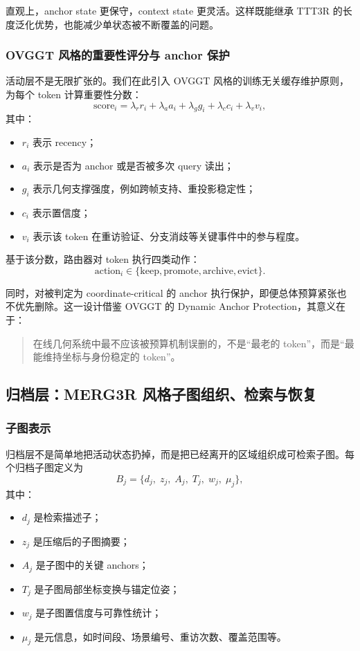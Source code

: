 \documentclass[12pt]{article}
\begin{document}
直观上，anchor state 更保守，context state 更灵活。这样既能继承 TTT3R 的长度泛化优势，也能减少单状态被不断覆盖的问题。

\subsubsection{OVGGT 风格的重要性评分与 anchor 保护}

活动层不是无限扩张的。我们在此引入 OVGGT 风格的训练无关缓存维护原则，为每个 token 计算重要性分数：
\begin{equation}
\mathrm{score}_i = \lambda_r r_i + \lambda_a a_i + \lambda_g g_i + \lambda_c c_i + \lambda_v v_i,
\end{equation}
其中：
\begin{itemize}
  \item $r_i$ 表示 recency；
  \item $a_i$ 表示是否为 anchor 或是否被多次 query 读出；
  \item $g_i$ 表示几何支撑强度，例如跨帧支持、重投影稳定性；
  \item $c_i$ 表示置信度；
  \item $v_i$ 表示该 token 在重访验证、分支消歧等关键事件中的参与程度。
\end{itemize}

基于该分数，路由器对 token 执行四类动作：
\begin{equation}
\mathrm{action}_i \in \{\text{keep}, \text{promote}, \text{archive}, \text{evict}\}.
\end{equation}

同时，对被判定为 coordinate-critical 的 anchor 执行保护，即便总体预算紧张也不优先删除。这一设计借鉴 OVGGT 的 Dynamic Anchor Protection，其意义在于：
\begin{quote}
在线几何系统中最不应该被预算机制误删的，不是“最老的 token”，而是“最能维持坐标与身份稳定的 token”。
\end{quote}

\subsection{归档层：MERG3R 风格子图组织、检索与恢复}

\subsubsection{子图表示}

归档层不是简单地把活动状态扔掉，而是把已经离开的区域组织成可检索子图。每个归档子图定义为
\begin{equation}
B_j = \{d_j,\; z_j,\; A_j,\; T_j,\; w_j,\; \mu_j\},
\end{equation}
其中：
\begin{itemize}
  \item $d_j$ 是检索描述子；
  \item $z_j$ 是压缩后的子图摘要；
  \item $A_j$ 是子图中的关键 anchors；
  \item $T_j$ 是子图局部坐标变换与锚定位姿；
  \item $w_j$ 是子图置信度与可靠性统计；
  \item $\mu_j$ 是元信息，如时间段、场景编号、重访次数、覆盖范围等。
\end{itemize}
\end{document}
